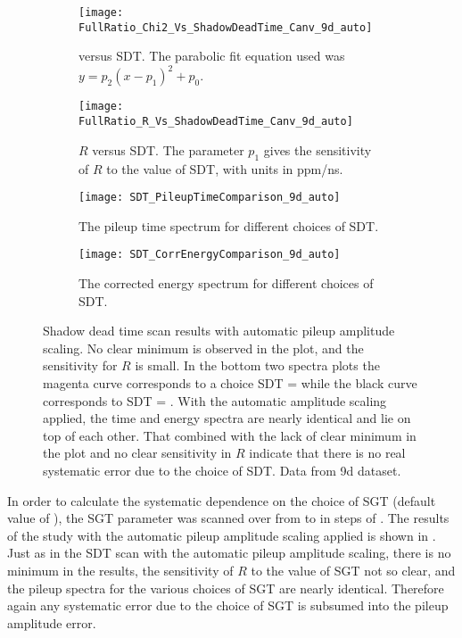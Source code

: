 \begin{figure}
\centering
    \begin{subfigure}[t]{0.45\textwidth}
        \centering
        \texttt{[image: FullRatio\_Chi2\_Vs\_ShadowDeadTime\_Canv\_9d\_auto]}
        \caption{\chisq versus SDT. The parabolic fit equation used was $y = p_{2}(x - p_{1})^{2} + p_{0}.$}
    \end{subfigure}%
    \hspace{1cm}
    \begin{subfigure}[t]{0.45\textwidth}
        \centering
        \texttt{[image: FullRatio\_R\_Vs\_ShadowDeadTime\_Canv\_9d\_auto]}
        \caption{$R$ versus SDT. The parameter $p_{1}$ gives the sensitivity of $R$ to the value of SDT, with units in ppm/ns.}
    \end{subfigure}

    \begin{subfigure}[t]{0.45\textwidth}
        \centering
        \texttt{[image: SDT\_PileupTimeComparison\_9d\_auto]}
        \caption{The pileup time spectrum for different choices of SDT.}
    \end{subfigure}%
    \hspace{1cm}
    \begin{subfigure}[t]{0.45\textwidth}
        \centering
        \texttt{[image: SDT\_CorrEnergyComparison\_9d\_auto]}
        \caption{The corrected energy spectrum for different choices of SDT.}
    \end{subfigure}
\caption[Pileup shadow dead time scan with automatic pileup amplitude scaling]{Shadow dead time scan results with automatic pileup amplitude scaling. No clear minimum is observed in the \chisq plot, and the sensitivity for $R$ is small. In the bottom two spectra plots the magenta curve corresponds to a choice SDT =  while the black curve corresponds to SDT = . With the automatic amplitude scaling applied, the time and energy spectra are nearly identical and lie on top of each other. That combined with the lack of clear minimum in the \chisq plot and no clear sensitivity in $R$ indicate that there is no real systematic error due to the choice of SDT. Data from 9d dataset.}
\label{fig:SDTscan_autoScaling}
\end{figure}


In order to calculate the systematic dependence on the choice of SGT (default value of ), the SGT parameter was scanned over from  to  in steps of . The results of the study with the automatic pileup amplitude scaling applied is shown in . Just as in the SDT scan with the automatic pileup amplitude scaling, there is no minimum in the \chisq results, the sensitivity of $R$ to the value of SGT not so clear, and the pileup spectra for the various choices of SGT are nearly identical. Therefore again any systematic error due to the choice of SGT is subsumed into the pileup amplitude error.


